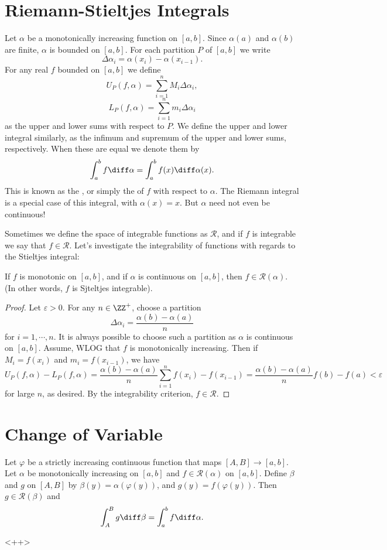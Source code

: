 \section{Riemann-Stieltjes Integrals}
\begin{definition}
Let $\alpha$ be a monotonically increasing function on $[a,b]$. Since $\alpha(a)$ and $\alpha(b)$ are finite, $\alpha$ is bounded on $[a,b]$. For each partition $P$ of $[a,b]$ we write 
\[ \Delta \alpha_i = \alpha(x_i) - \alpha(x_{i-1}). \] For any real $f$ bounded on $[a,b]$ we define 
\[ U_P(f, \alpha) = \sum_{i=1}^n M_i \Delta \alpha_i, \]
\[ L_P(f, \alpha) = \sum_{i=1}^n m_i \Delta \alpha_i \] as the upper and lower sums with respect to $P$. We define the upper and lower integral similarly, as the infimum and supremum of the upper and lower sums, respectively. When these are equal we denote them by 
\[ \int_a^b f \diff \alpha = \int_a^b f(x) \diff \alpha(x). \] This is known as the , or simply the  of $f$ with respect to $\alpha$. The Riemann integral is a special case of this integral, with $\alpha(x) = x$. But $\alpha$ need not even be continuous!
\end{definition}
Sometimes we define the space of integrable functions as $\mathcal{R}$, and if $f$ is integrable we say that $f \in \mathcal{R}$. Let's investigate the integrability of functions with regards to the Stieltjes integral:
\begin{theorem}
If $f$ is monotonic on $[a,b]$, and if $\alpha$ is continuous on $[a,b]$, then $f \in \mathcal{R}(\alpha)$. (In other words, $f$ is Sjteltjes integrable). 
\end{theorem}
\begin{proof}
Let $\varepsilon > 0$. For any $n \in \ZZ^+$, choose a partition 
\[ \Delta \alpha_i = \dfrac{\alpha(b) - \alpha(a)}{n} \] for $i = 1,\cdots,n$. It is always possible to choose such a partition as $\alpha$ is continuous on $[a,b]$. Assume, WLOG that $f$ is monotonically increasing. Then if $M_i = f(x_i)$ and $m_i = f(x_{i-1})$, we have 
\[ U_P(f, \alpha) - L_P(f, \alpha) = \dfrac{\alpha(b) - \alpha(a)}{n} \sum\limits_{i=1}^n f(x_i) - f(x_{i-1}) = \dfrac{\alpha(b) - \alpha(a)}{n} f(b) - f(a) < \varepsilon \] for large $n$, as desired. By the integrability criterion, $f \in \mathcal{R}$. 
\end{proof}
\section{Change of Variable}
\begin{theorem}
Let $\varphi$ be a strictly increasing continuous function that maps $[A,B] \to [a,b]$. Let $\alpha$ be monotonically increasing on $[a,b]$ and $f \in \mathcal{R}(\alpha)$ on $[a,b]$. Define $\beta$ and $g$ on $[A,B]$ by $\beta(y) = \alpha(\varphi(y))$, and $g(y) = f(\varphi(y))$. Then $g \in \mathcal{R}(\beta)$ and 
\[ \int_A^B g \diff \beta = \int_a^b f \diff \alpha. \] 
\end{theorem}<++>
